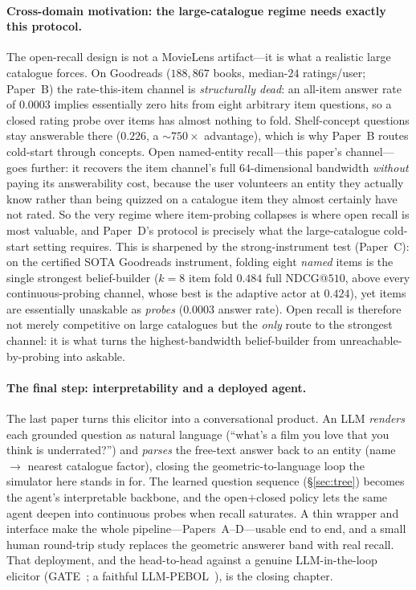 \documentclass[11pt]{article}
\begin{document}
\paragraph{Cross-domain motivation: the large-catalogue regime needs exactly this protocol.} The open-recall design is
not a MovieLens artifact---it is what a realistic large catalogue forces. On Goodreads ($188{,}867$ books, median-$24$
ratings/user; Paper~B) the rate-this-item channel is \emph{structurally dead}: an all-item answer rate of $0.0003$
implies essentially zero hits from eight arbitrary item questions, so a closed rating probe over items has almost
nothing to fold. Shelf-concept questions stay answerable there ($0.226$, a $\sim\!750\times$ advantage), which is why
Paper~B routes cold-start through concepts. Open named-entity recall---this paper's channel---goes further: it recovers
the item channel's full $64$-dimensional bandwidth \emph{without} paying its answerability cost, because the user
volunteers an entity they actually know rather than being quizzed on a catalogue item they almost certainly have not
rated. So the very regime where item-probing collapses is where open recall is most valuable, and Paper~D's protocol is
precisely what the large-catalogue cold-start setting requires. This is sharpened by the strong-instrument test
(Paper~C): on the certified SOTA Goodreads instrument, folding eight \emph{named} items is the single strongest
belief-builder ($k{=}8$ item fold $0.484$ full NDCG@$510$, above every continuous-probing channel, whose best is the
adaptive actor at $0.424$), yet items are essentially unaskable as \emph{probes} ($0.0003$ answer rate). Open recall is
therefore not merely competitive on large catalogues but the \emph{only} route to the strongest channel: it is what
turns the highest-bandwidth belief-builder from unreachable-by-probing into askable.

\paragraph{The final step: interpretability and a deployed agent.} The last paper turns this elicitor into a
conversational product. An LLM \emph{renders} each grounded question as natural language (``what's a film you love that
you think is underrated?'') and \emph{parses} the free-text answer back to an entity (name $\to$ nearest catalogue
factor), closing the geometric-to-language loop the simulator here stands in for. The learned question sequence
(\S\ref{sec:tree}) becomes the agent's interpretable backbone, and the open$+$closed policy lets the same agent deepen
into continuous probes when recall saturates. A thin wrapper and interface make the whole pipeline---Papers~A--D---usable
end to end, and a small human round-trip study replaces the geometric answerer band with real recall. That deployment,
and the head-to-head against a genuine LLM-in-the-loop elicitor (GATE~\cite{gate}; a faithful LLM-PEBOL~\cite{pebol}), is the closing chapter.
\end{document}
